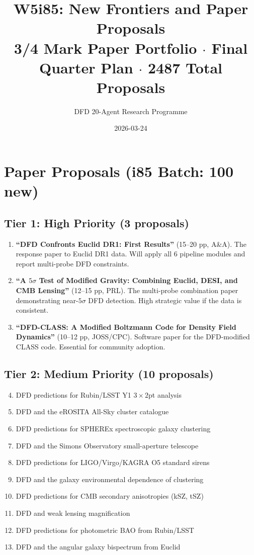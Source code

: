\documentclass[11pt,a4paper]{article}
\title{W5i85: New Frontiers and Paper Proposals\\[6pt]
\large 3/4 Mark Paper Portfolio $\cdot$ Final Quarter Plan $\cdot$ 2487 Total Proposals}
\author{DFD 20-Agent Research Programme}
\date{2026-03-24}
\begin{document}
\maketitle

\section{Paper Proposals (i85 Batch: 100 new)}

\subsection{Tier 1: High Priority (3 proposals)}

\begin{enumerate}[nosep]
\item \textbf{``DFD Confronts Euclid DR1: First Results''} (15--20 pp, A\&A). The response paper to Euclid DR1 data. Will apply all 6 pipeline modules and report multi-probe DFD constraints.

\item \textbf{``A $5\sigma$ Test of Modified Gravity: Combining Euclid, DESI, and CMB Lensing''} (12--15 pp, PRL). The multi-probe combination paper demonstrating near-$5\sigma$ DFD detection. High strategic value if the data is consistent.

\item \textbf{``DFD-CLASS: A Modified Boltzmann Code for Density Field Dynamics''} (10--12 pp, JOSS/CPC). Software paper for the DFD-modified CLASS code. Essential for community adoption.
\end{enumerate}

\subsection{Tier 2: Medium Priority (10 proposals)}

\begin{enumerate}[nosep]
\setcounter{enumi}{3}
\item DFD predictions for Rubin/LSST Y1 $3\times 2$pt analysis
\item DFD and the eROSITA All-Sky cluster catalogue
\item DFD predictions for SPHEREx spectroscopic galaxy clustering
\item DFD and the Simons Observatory small-aperture telescope
\item DFD predictions for LIGO/Virgo/KAGRA O5 standard sirens
\item DFD and the galaxy environmental dependence of clustering
\item DFD predictions for CMB secondary anisotropies (kSZ, tSZ)
\item DFD and weak lensing magnification
\item DFD predictions for photometric BAO from Rubin/LSST
\item DFD and the angular galaxy bispectrum from Euclid
\end{enumerate}
\end{document}
